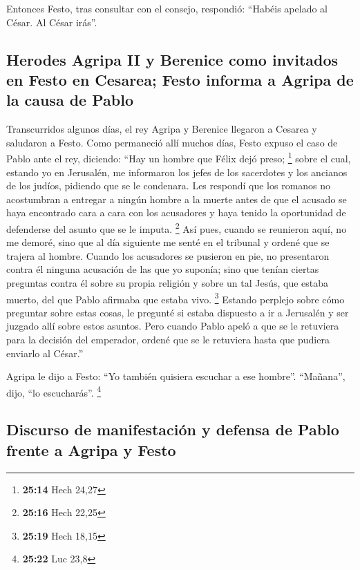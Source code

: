 \begin{paracol}{2}
 Entonces Festo, tras consultar con el consejo,
respondió: ``Habéis apelado al César. Al César irás''.

\hypertarget{herodes-agripa-ii-y-berenice-como-invitados-en-festo-en-cesarea-festo-informa-a-agripa-de-la-causa-de-pablo}{%
\subsection{Herodes Agripa II y Berenice como invitados en Festo en
Cesarea; Festo informa a Agripa de la causa de
Pablo}\label{herodes-agripa-ii-y-berenice-como-invitados-en-festo-en-cesarea-festo-informa-a-agripa-de-la-causa-de-pablo}}

 Transcurridos algunos días, el rey Agripa y Berenice
llegaron a Cesarea y saludaron a Festo.  Como permaneció
allí muchos días, Festo expuso el caso de Pablo ante el rey, diciendo:
``Hay un hombre que Félix dejó preso; \footnote{\textbf{25:14} Hech
  24,27}  sobre el cual, estando yo en Jerusalén, me
informaron los jefes de los sacerdotes y los ancianos de los judíos,
pidiendo que se le condenara.  Les respondí que los
romanos no acostumbran a entregar a ningún hombre a la muerte antes de
que el acusado se haya encontrado cara a cara con los acusadores y haya
tenido la oportunidad de defenderse del asunto que se le imputa.
\footnote{\textbf{25:16} Hech 22,25}  Así pues, cuando se
reunieron aquí, no me demoré, sino que al día siguiente me senté en el
tribunal y ordené que se trajera al hombre.  Cuando los
acusadores se pusieron en pie, no presentaron contra él ninguna
acusación de las que yo suponía;  sino que tenían ciertas
preguntas contra él sobre su propia religión y sobre un tal Jesús, que
estaba muerto, del que Pablo afirmaba que estaba vivo. \footnote{\textbf{25:19}
  Hech 18,15}  Estando perplejo sobre cómo preguntar
sobre estas cosas, le pregunté si estaba dispuesto a ir a Jerusalén y
ser juzgado allí sobre estos asuntos.  Pero cuando Pablo
apeló a que se le retuviera para la decisión del emperador, ordené que
se le retuviera hasta que pudiera enviarlo al César.''

 Agripa le dijo a Festo: ``Yo también quisiera escuchar a
ese hombre''. ``Mañana'', dijo, ``lo escucharás''. \footnote{\textbf{25:22}
  Luc 23,8}

\hypertarget{discurso-de-manifestaciuxf3n-y-defensa-de-pablo-frente-a-agripa-y-festo}{%
\subsection{Discurso de manifestación y defensa de Pablo frente a Agripa
y
Festo}\label{discurso-de-manifestaciuxf3n-y-defensa-de-pablo-frente-a-agripa-y-festo}}


\end{paracol}
